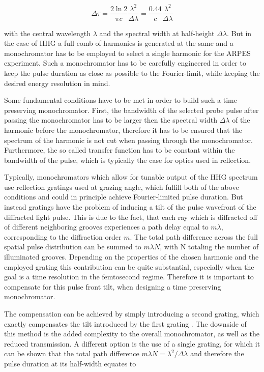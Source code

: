 \begin{equation}
	\Delta\tau = \frac{2 \ln{2}}{\pi c}\frac{\lambda^2}{\Delta\lambda} = \frac{0.44}{c}\frac{\lambda^2}{\Delta\lambda}
\end{equation}

with the central wavelength $\lambda$ and the spectral width at half-height $\Delta\lambda$.
But in the case of HHG a full comb of harmonics is generated at the same and a monochromator has to be employed to select a single harmonic for the ARPES experiment.
Such a monochromator has to be carefully engineered in order to keep the pulse duration as close as possible to the Fourier-limit, while keeping the desired energy resolution in mind.

Some fundamental conditions have to be met in order to build such a time preserving monochromator.
First, the bandwidth of the selected probe pulse after passing the monochromator has to be larger then the spectral width $\Delta\lambda$ of the harmonic before the monochromator, therefore it has to be ensured that the spectrum of the harmonic is not cut when passing through the monochromator.
Furthermore, the so called transfer function has to be constant within the bandwidth of the pulse, which is typically the case for optics used in reflection.

Typically, monochromators which allow for tunable output of the HHG spectrum use reflection gratings used at grazing angle, which fulfill both of the above conditions and could in principle achieve Fourier-limited pulse duration.
But instead gratings have the problem of inducing a tilt of the pulse wavefront of the diffracted light pulse.
This is due to the fact, that each ray which is diffracted off of different neighboring grooves experiences a path delay equal to $m\lambda$, corresponding to the diffraction order $m$.
The total path difference across the full spatial pulse distribution can be summed to $m\lambda N$, with N totaling the number of illuminated grooves.
Depending on the properties of the chosen harmonic and the employed grating this contribution can be quite substantial, especially when the goal is a time resolution in the femtosecond regime.
Therefore it is important to compensate for this pulse front tilt, when designing a time preserving monochromator.

The compensation can be achieved by simply introducing a second grating, which exactly compensates the tilt introduced by the first grating \cite{villoresi_compensation_1999}.
The downside of this method is the added complexity to the overall monochromator, as well as the reduced transmission.
A different option is the use of a single grating, for which it can be shown that the total path difference $m\lambda N=\lambda^2/\Delta\lambda$ \cite{samson_j_a_vacuum_1998} and therefore the pulse duration at its half-width equates to

